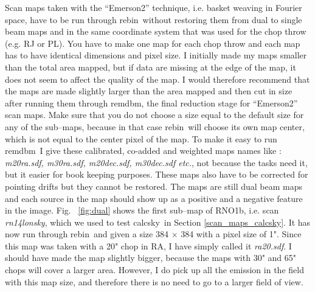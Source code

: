 \documentclass[twoside,11pt]{article}
\newcommand{\task}[1]{\textsf{#1}}
\newcommand{\rebin}{\xref{\task{rebin}}{sun216}{REBIN}}
\newcommand{\remdbm}{\xref{\task{remdbm}}{sun216}{REMDBM}}
\newcommand{\calcsky}{\xref{\task{calcsky}}{sun216}{CALCSKY}}
\newcommand{\xref}[3]{#1}
\renewcommand{\_}{\texttt{\symbol{95}}}
\begin{document}
Scan maps taken with the ``Emerson2'' technique, i.e. basket weaving in
Fourier space, have to be run through \rebin\ without restoring them
from dual to single beam maps and in the same coordinate system that
was used for the chop throw (e.g. RJ or PL). You have to make one map
for each chop throw and each map has to have identical dimensions and
pixel size. I initially made my maps smaller than the total area
mapped, but if data are missing at the edge of the map, it does not
seem to affect the quality of the map. I would therefore recommend that
the maps are made slightly larger than the area mapped and then cut in
size after running them through \remdbm, the final reduction stage for
``Emerson2'' scan maps. Make sure that you do not choose a size equal
to the default size for any of the sub--maps, because in that case
\rebin\ will choose its own map center, which is not equal to the
center pixel of the map. To make it easy to run \remdbm\ I give these
calibrated, co-added and weighted maps names like : {\it m20ra.sdf,
m30ra.sdf, m20dec.sdf, m30dec.sdf etc.}, not because the tasks need it,
but it easier for book keeping purposes. These maps also have to be
corrected for pointing drifts but they cannot be restored. The maps are
still dual beam maps and each source in the map should show up as a
positive and a negative feature in the image. Fig. \ \ref{fig:dual}
shows the first sub--map of RNO1b, i.e. scan {\it rn14\_lon\_sky},
which we used to test \calcsky\ in Section \ref{scan_maps_calcsky}. It
has now run through \rebin\ and given a size 384 $\times$ 384 with a
pixel size of 1". Since this map was taken with a 20" chop in RA, I
have simply called it {\it ra20.sdf}. I should have made the map
slightly bigger, because the maps with 30" and 65" chops will cover a
larger area. However, I do pick up all the emission in the field with
this map size, and therefore there is no need to go to a larger field
of view.
\end{document}
